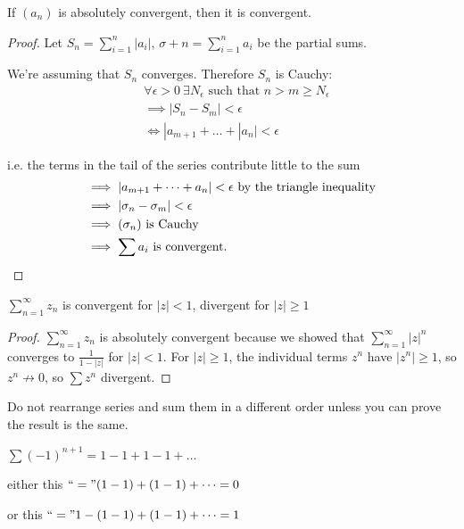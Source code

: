 \documentclass[10pt,twoside]{scrartcl}
\begin{document}
\begin{theorem}
	If $(a_n)$ is absolutely convergent, then it is convergent.
\end{theorem}

\begin{proof}
Let $S_n = \sum_{i=1}^{n} |a_i|$, $\sigma+n = \sum_{i=1}^n a_i$ be the partial sums.

We're assuming that $S_n$ converges. Therefore $S_n$ is Cauchy: 
\begin{align*} &\forall \epsilon >0~ \exists N_{\epsilon}\text{ such that }n > m \geq N_{\epsilon}\\
 &\implies |S_n - S_m| < \epsilon \\
 &\iff |a_{m+1} + \dots + |a_n| < \epsilon	
\end{align*}

i.e. the terms in the tail of the series contribute little to the sum 
\begin{align*}
  &\implies |a_{m+1} + \dots + a_n| < \epsilon\text{ by the triangle inequality }\\
  &\implies |\sigma_n - \sigma_m| < \epsilon\\
  &\implies (\sigma_n)\text{ is Cauchy }\\
  &\implies \sum a_i\text{ is convergent.} \qedhere
\end{align*}
\end{proof}\vspace*{5pt}

\begin{example}
$\sum_{n=1}^{\infty} z_n$ is convergent for $|z| < 1$, divergent for $|z| \geq 1$
\begin{proof}
$\sum_{n=1}^{\infty} z_n$ is absolutely convergent because we showed that $\sum_{n=1}^{\infty} |z|^n$ converges to $\frac{1}{1 - |z|}$ for $|z| < 1$.	 For $|z| \geq 1$, the individual terms $z^n$ have $|z^n| \geq 1$, so $z^n \not\to 0$, so $\sum z^n$ divergent.
\end{proof}
\end{example}


\vspace*{5pt}

\begin{warning} Do not rearrange series and sum them in a different order unless you can prove the result is the same.	
\end{warning}


\begin{example}
$\sum (-1)^{n+1} = 1 - 1 + 1 - 1 + \dots$

either this $``=" (1-1) + (1-1) + \dots = 0$

or this $``=" 1 - (1-1) + (1-1) + \dots = 1$	
\end{example}
\end{document}
